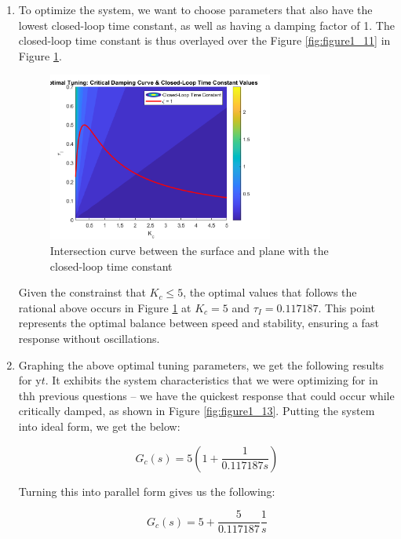 \documentclass[12pt]{article}
\begin{document}
\begin{enumerate}
\begin{enumerate}
    \item
    To optimize the system, we want to choose parameters that also have the lowest closed-loop time constant, as well as having a damping factor of 1. The closed-loop time constant is thus overlayed over the Figure \ref{fig:figure1_11} in Figure \ref{fig:figure1_12}.

    \begin{figure}[H]
      \centering
      \includegraphics[width=0.7\textwidth]{Figures/figure1_12.png}
      \caption{Intersection curve between the surface and plane with the closed-loop time constant}
      \label{fig:figure1_12}
    \end{figure}

    Given the constrainst that $K_c \leq 5$, the optimal values that follows the rational above occurs in Figure \ref{fig:figure1_12} at $K_c = 5$ and $\tau_I = 0.117187$. This point represents the optimal balance between speed and stability, ensuring a fast response without oscillations.

    \item
    Graphing the above optimal tuning parameters, we get the following results for y\(t\). It exhibits the system characteristics that we were optimizing for in thh previous questions -- we have the quickest response that could occur while critically damped, as shown in Figure \ref{fig:figure1_13}. Putting the system into ideal form, we get the below:

    \[
    G_c(s) = 5 \left( 1 + \frac{1}{0.117187 s} \right)
    \]

    Turning this into parallel form gives us the following:

    \[
    G_c(s) = 5 + \frac{5}{0.117187} \frac{1}{s}
    \]


\end{enumerate}
\end{enumerate}
\end{document}
